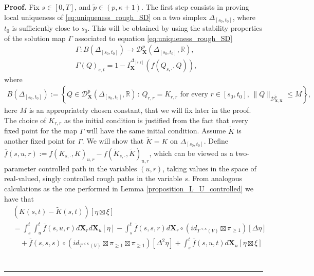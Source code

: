 \documentclass{article}%
\newenvironment{proof}[1][Proof]{\noindent\textbf{#1.} }{\ \rule{0.5em}{0.5em}}
\begin{document}
\begin{proof}
Fix $s \in [0, T]$, and $\tilde{p} \in (p, \kappa  +1 )$. The first step consists in proving local uniqueness of \eqref{eq:uniqueness_rough_SD} on a two simplex $\Delta_{[s_0,t_0]}$, where $t_0$ is sufficiently close to $s_0$.\newline
This will be obtained by using the stability properties of the solution map $\Gamma$ associated to equation \eqref{eq:uniqueness_rough_SD}
\begin{align*}
&\Gamma: B(\Delta_{[s_0, t_0 ]}) \to \mathcal{D}^p_{\mathbf{X}}(\Delta_{[s_0, t_0]}, \mathbb{R}),   \\ 
& \Gamma(Q)_{s,t} = 1- I^{\Delta_{[s, t]}}_{\mathbf{X}}(f(Q_{s, \cdot}, Q)),
\end{align*}
where
\begin{align*}
B(\Delta_{[s_0, t_0]}) := \left \{ Q \in \mathcal{D}^{\tilde{p}}_{\mathbf{X}}(\Delta_{[s_0, t_0]}, \mathbb{R}) \, : \, Q_{r,r} =  K_{r,r}  \text{ for every }  r \in [s_0, t_0],   \,  \|Q\|_{ \mathcal{D}^{\tilde{p}}_{ \mathbf{X}, \mathbf{X}}} \leq M \right \},
\end{align*}
here $M$ is an appropriately chosen constant, that we will fix later in the proof. The choice of $K_{r,r}$ as the initial condition is justified from the fact that every fixed point for the map $\Gamma$ will have the same initial condition.\newline
Assume $\tilde{K}$ is another fixed point for $\Gamma$. We will show that $\tilde K = K$ on $\Delta_{[s_0,t_0]}$.\newline
Define
\(\overline{f}(s,u,r) := f(K_{s,\cdot}, K)_{u,r} - f(\tilde{K}_{s, \cdot}, \tilde{K})_{u,r}\), which can be viewed as a two-parameter controlled path in the variables 
$(u,r)$, taking values in the space of real-valued, singly controlled rough paths in the variable 
$s$.\newline
From analogous calculations as the one performed in Lemma \ref{proposition_L_U_controlled} we have 
that 
\begin{equation}\label{formula_K_K}
\begin{aligned}
    & \left(K(s,t) - \tilde K(s,t) \right)\left[ \eta \boxtimes \xi \right]\\
    &= \int_s^t \int_u^t \overline f(s, u, r) d\mathbf{X}_r d\mathbf{X}_u \left[ \eta \right] - \int_s^t \overline f(s,s,r) d\mathbf{X}_r \circ (id_{T^{<\kappa}(V)}  \boxtimes \pi_{\geq 1}) \left[\Delta \eta\right]\\
    & \quad + \overline f (s,s,s) \circ (id_{T^{<\kappa}(V)} \boxtimes \pi_{\geq 1} \boxtimes \pi_{\geq 1}) \left[\Delta^2 \eta\right]  + \int_s^t \overline f (s,u,t)d\mathbf{X}_u \left[ \eta \boxtimes \xi \right] \\

\end{aligned}
\end{equation}
\end{proof}
\end{document}

